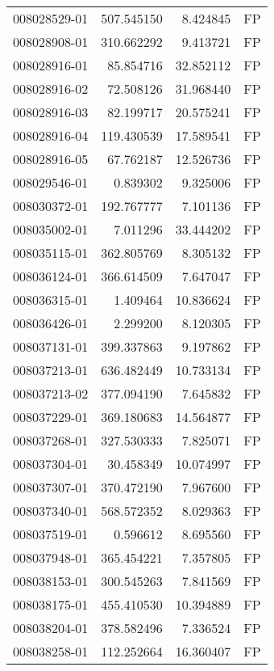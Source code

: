 \begin{tabular}{lrrl}
008028529-01 &  507.545150 &       8.424845 &   FP \\
008028908-01 &  310.662292 &       9.413721 &   FP \\
008028916-01 &   85.854716 &      32.852112 &   FP \\
008028916-02 &   72.508126 &      31.968440 &   FP \\
008028916-03 &   82.199717 &      20.575241 &   FP \\
008028916-04 &  119.430539 &      17.589541 &   FP \\
008028916-05 &   67.762187 &      12.526736 &   FP \\
008029546-01 &    0.839302 &       9.325006 &   FP \\
008030372-01 &  192.767777 &       7.101136 &   FP \\
008035002-01 &    7.011296 &      33.444202 &   FP \\
008035115-01 &  362.805769 &       8.305132 &   FP \\
008036124-01 &  366.614509 &       7.647047 &   FP \\
008036315-01 &    1.409464 &      10.836624 &   FP \\
008036426-01 &    2.299200 &       8.120305 &   FP \\
008037131-01 &  399.337863 &       9.197862 &   FP \\
008037213-01 &  636.482449 &      10.733134 &   FP \\
008037213-02 &  377.094190 &       7.645832 &   FP \\
008037229-01 &  369.180683 &      14.564877 &   FP \\
008037268-01 &  327.530333 &       7.825071 &   FP \\
008037304-01 &   30.458349 &      10.074997 &   FP \\
008037307-01 &  370.472190 &       7.967600 &   FP \\
008037340-01 &  568.572352 &       8.029363 &   FP \\
008037519-01 &    0.596612 &       8.695560 &   FP \\
008037948-01 &  365.454221 &       7.357805 &   FP \\
008038153-01 &  300.545263 &       7.841569 &   FP \\
008038175-01 &  455.410530 &      10.394889 &   FP \\
008038204-01 &  378.582496 &       7.336524 &   FP \\
008038258-01 &  112.252664 &      16.360407 &   FP \\

\end{tabular}
